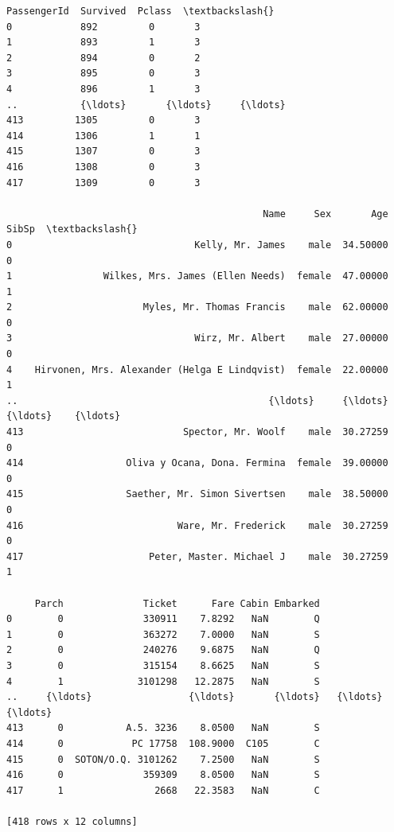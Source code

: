 \documentclass[11pt]{article}
\makeatletter
\newcommand{\boxspacing}{\kern\kvtcb@left@rule\kern\kvtcb@boxsep}
\newcommand{\prompt}[4]{
        {\ttfamily\llap{{\color{#2}[#3]:\hspace{3pt}#4}}\vspace{-\baselineskip}}
    }
\makeatother
\begin{document}
            \begin{tcolorbox}[breakable, size=fbox, boxrule=.5pt, pad at break*=1mm, opacityfill=0]
\prompt{Out}{outcolor}{25}{\boxspacing}
\begin{Verbatim}[commandchars=\\\{\}]
     PassengerId  Survived  Pclass  \textbackslash{}
0            892         0       3
1            893         1       3
2            894         0       2
3            895         0       3
4            896         1       3
..           {\ldots}       {\ldots}     {\ldots}
413         1305         0       3
414         1306         1       1
415         1307         0       3
416         1308         0       3
417         1309         0       3

                                             Name     Sex       Age  SibSp  \textbackslash{}
0                                Kelly, Mr. James    male  34.50000      0
1                Wilkes, Mrs. James (Ellen Needs)  female  47.00000      1
2                       Myles, Mr. Thomas Francis    male  62.00000      0
3                                Wirz, Mr. Albert    male  27.00000      0
4    Hirvonen, Mrs. Alexander (Helga E Lindqvist)  female  22.00000      1
..                                            {\ldots}     {\ldots}       {\ldots}    {\ldots}
413                            Spector, Mr. Woolf    male  30.27259      0
414                  Oliva y Ocana, Dona. Fermina  female  39.00000      0
415                  Saether, Mr. Simon Sivertsen    male  38.50000      0
416                           Ware, Mr. Frederick    male  30.27259      0
417                      Peter, Master. Michael J    male  30.27259      1

     Parch              Ticket      Fare Cabin Embarked
0        0              330911    7.8292   NaN        Q
1        0              363272    7.0000   NaN        S
2        0              240276    9.6875   NaN        Q
3        0              315154    8.6625   NaN        S
4        1             3101298   12.2875   NaN        S
..     {\ldots}                 {\ldots}       {\ldots}   {\ldots}      {\ldots}
413      0           A.5. 3236    8.0500   NaN        S
414      0            PC 17758  108.9000  C105        C
415      0  SOTON/O.Q. 3101262    7.2500   NaN        S
416      0              359309    8.0500   NaN        S
417      1                2668   22.3583   NaN        C

[418 rows x 12 columns]
\end{Verbatim}
\end{tcolorbox}
\end{document}
